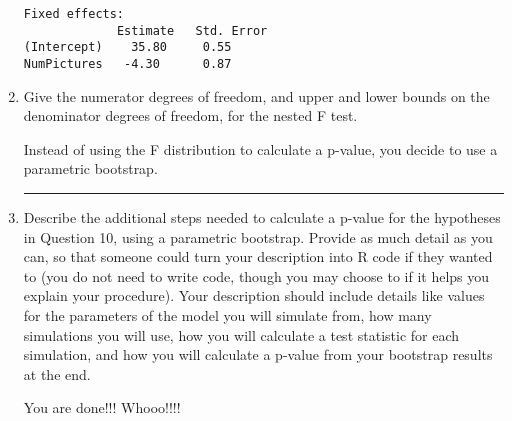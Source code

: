 \documentclass[11pt]{article}
\begin{document}
\begin{enumerate}
\begin{verbatim}
Fixed effects:
             Estimate   Std. Error 
(Intercept)    35.80     0.55      
NumPictures   -4.30      0.87 
\end{verbatim}

\vspace{0.5cm}

\item Give the numerator degrees of freedom, and upper and lower bounds on the denominator degrees of freedom, for the nested F test.

\pagebreak


Instead of using the F distribution to calculate a p-value, you decide to use a parametric bootstrap.

\rule{\textwidth}{1pt}

\item Describe the additional steps needed to calculate a p-value for the hypotheses in Question 10, using a parametric bootstrap. Provide as much detail as you can, so that someone could turn your description into R code if they wanted to (you do not need to write code, though you may choose to if it helps you explain your procedure). Your description should include details like values for the parameters of the model you will simulate from, how many simulations you will use, how you will calculate a test statistic for each simulation, and how you will calculate a p-value from your bootstrap results at the end.


\pagebreak


\huge{You are done!!! Whooo!!!!}




\end{enumerate}




\end{document}
